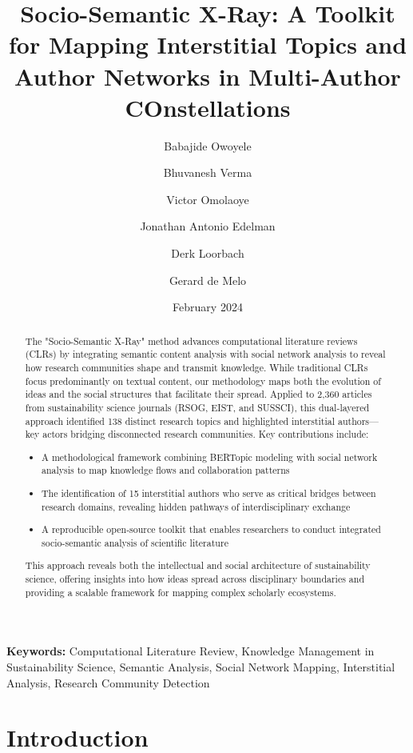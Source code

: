 \documentclass[12pt]{article}
\title{Socio-Semantic X-Ray: A Toolkit for Mapping Interstitial Topics and Author Networks in Multi-Author COnstellations}
\author[1,2]{Babajide Owoyele}
\author[3]{Bhuvanesh Verma}
\author[3]{Victor Omolaoye}
\author[5]{Jonathan Antonio Edelman}
\author[3]{Derk Loorbach}
\author[1,4]{Gerard de Melo}
\affil[1]{Hasso Plattner Institute (HPI)}
\affil[2]{Dutch Research Institute for Transitions, Erasmus University Rotterdam,The Netherlands}
\affil[3]{University of Potsdam}
\affil[4]{Center for Advanced Design Studies}
\date{February 2024}
\newcommand{\keywords}[1]{\vspace{2mm}\noindent\textbf{Keywords:} #1}
\begin{document}
\maketitle





\begin{abstract}
The "Socio-Semantic X-Ray" method advances computational literature reviews (CLRs) by integrating semantic content analysis with social network analysis to reveal how research communities shape and transmit knowledge. While traditional CLRs focus predominantly on textual content, our methodology maps both the evolution of ideas and the social structures that facilitate their spread. Applied to 2,360 articles from sustainability science journals (RSOG, EIST, and SUSSCI), this dual-layered approach identified 138 distinct research topics and highlighted interstitial authors—key actors bridging disconnected research communities.
Key contributions include:
\begin{itemize}
\item A methodological framework combining BERTopic modeling with social network analysis to map knowledge flows and collaboration patterns
\item The identification of 15 interstitial authors who serve as critical bridges between research domains, revealing hidden pathways of interdisciplinary exchange
\item A reproducible open-source toolkit that enables researchers to conduct integrated socio-semantic analysis of scientific literature
\end{itemize}
This approach reveals both the intellectual and social architecture of sustainability science, offering insights into how ideas spread across disciplinary boundaries and providing a scalable framework for mapping complex scholarly ecosystems.
\end{abstract}
\keywords{Computational Literature Review,
Knowledge Management in Sustainability Science,
Semantic Analysis,
Social Network Mapping,
Interstitial Analysis,
Research Community Detection}


\section{Introduction}
\label{sec:introduction}
\end{document}
